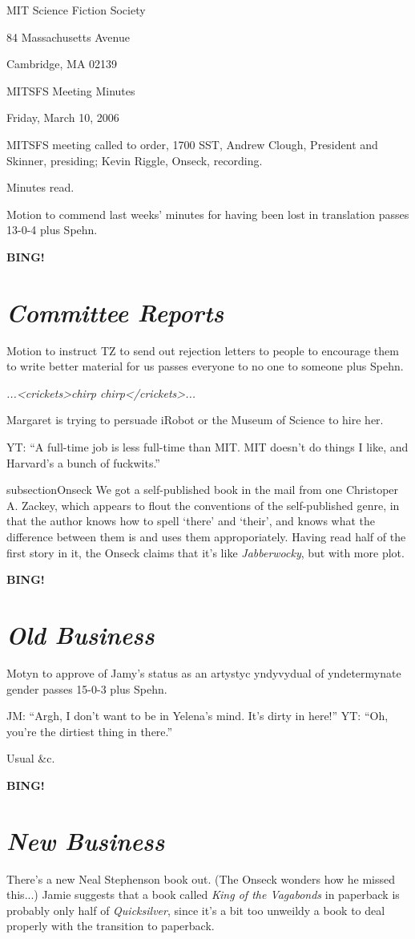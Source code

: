 \documentclass[10pt]{article}
\newcommand{\bing}{{\bf BING!} }
\newcommand{\goto}[1]{\bing \vskip 12pt \section*{{\em{#1}}}}
\newcommand{\ps}{ plus Spehn\xspace}
\begin{document}
\begin{center}

MIT Science Fiction Society

84 Massachusetts Avenue

Cambridge, MA 02139

\vspace{12pt}

MITSFS Meeting Minutes

Friday, March 10, 2006

\end{center}

\vspace{18pt}

\setlength{\parskip}{6pt}

\noindent
MITSFS meeting called to order, 1700 SST,
Andrew Clough, President and Skinner, presiding; Kevin Riggle, Onseck, recording.

Minutes read.

Motion to commend last weeks' minutes for having been lost in translation passes 13-0-4\ps.

\goto{Committee Reports}
Motion to instruct TZ to send out rejection letters to people to encourage them to write better
material for us passes everyone to no one to someone \ps.

\emph{...<crickets>chirp chirp</crickets>...}

Margaret is trying to persuade iRobot or the Museum of Science to hire her.

YT: ``A full-time job is less full-time than MIT.  MIT doesn't do things I like, and Harvard's a
bunch of fuckwits.''

\*subsection{Onseck}
We got a self-published book in the mail from one Christoper A. Zackey, which appears to flout the
conventions of the self-published genre, in that the author knows how to spell `there' and `their',
and knows what the difference between them is and uses them approporiately.  Having read half of
the first story in it, the Onseck claims that it's like \emph{Jabberwocky}, but with more plot.

\goto{Old Business}

Motyn to approve of Jamy's status as an artystyc yndyvydual of yndetermynate gender passes 15-0-3\ps.

JM: ``Argh, I don't want to be in Yelena's mind.  It's dirty in here!''
YT: ``Oh, you're the dirtiest thing in there.''

Usual &c.

\goto{New Business}
There's a new Neal Stephenson book out.  (The Onseck wonders how he missed this...)  Jamie suggests
that a book called \emph{King of the Vagabonds} in paperback is probably only half of 
\emph{Quicksilver}, since it's a bit too unweildy a book to deal properly with the transition to
paperback.
\end{document}
